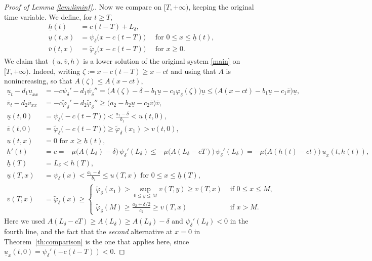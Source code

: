 \documentclass[reqno]{amsart}
\newcommand{\rev}[1]{#1}
\theoremstyle{plain}
\theoremstyle{definition}
\theoremstyle{remark}
\begin{document}
\begin{proof}[Proof of Lemma \ref{lem:liminf}.]
		\rev{Now we compare on $[T,+\infty)$, keeping the original time variable. We define, for $t\ge T$,}
		\begin{align*}
			\underline{h}(t)&=c \rev{(t-T)}+L_\delta ,\\
			\underline{u}(t,x)&=\psi_\delta\bigl(x-c \rev{(t-T)}\bigr) \quad\text{ for } 0\le x \le \underline{h}(t),\\
			\overline{v}(t,x)&=\tilde{\varphi}_\delta\bigl(x-c \rev{(t-T)}\bigr)\quad\text{ for } x \ge 0.
		\end{align*}
		We claim that \((\underline{u},\overline{v},\underline{h})\) is a lower solution of the original system \eqref{main} \rev{on $[T,+\infty)$}. Indeed, \rev{writing $\zeta:=x-c(t-T)\ge x-ct$ and using that $A$ is nonincreasing, so that $A(\zeta)\le A(x-ct)$,}
		\begin{align*}
			\underline{u}_t-d_1\underline{u}_{xx}
			&=-c\psi_\delta'-d_1\psi_\delta''
			\rev{{}=\bigl(A(\zeta)-\delta-b_1\underline{u}-c_1\varphi_\delta(\zeta)\bigr)\underline{u}}
			\le\bigl(A(x-ct)-b_1\underline{u}-c_1\overline{v}\bigr)\underline{u},\\
			\overline{v}_t-d_2\overline{v}_{xx}
			&=-c\tilde{\varphi}_\delta'-d_2\tilde{\varphi}_\delta''
			\ge\bigl(a_2-b_2\underline{u}-c_2\overline{v}\bigr)\overline{v},\\
			\underline{u}(t,0)&=\psi_\delta\bigl(\rev{-c(t-T)}\bigr) < \frac{a_1 - \delta}{b_1} < u(\rev{t},0),\\
			\overline{v}(t,0)&=\tilde{\varphi}_\delta\bigl(\rev{-c(t-T)}\bigr)\ge\tilde{\varphi}_\delta(x_1) > v(\rev{t},0),\\
			\underline{u}(t,x)&=0 \text{ for } x \ge \underline{h}(t),\\
			\underline{h}'(t)&=c=-\mu\bigl(A(L_\delta)-\delta\bigr)\,\psi_\delta'(L_\delta) \le -\mu\bigl(\rev{A(L_\delta-cT)}\bigr)\,\psi_\delta'(L_\delta) = -\mu\bigl(A(\underline{h}(t)-ct)\bigr)\,\underline{u}_x(t,\underline{h}(t)),\\
			\rev{\underline{h}(T)}&\rev{{}=L_\delta<h(T)},\\
			\rev{\underline{u}(T,x)}&\rev{{}=\psi_\delta(x) < \frac{a_1 - \delta}{b_1} \le u(T,x) \text{ for } 0\le x\le \underline{h}(T)},\\
			\rev{\overline{v}(T,x)}&\rev{{}=\tilde{\varphi}_\delta(x) \ge \begin{cases}
				\tilde{\varphi}_\delta(x_1)>\sup_{0\le y\le M}v(T,y)\ge v(T,x) & \text{ if } 0\le x\le M,\\
				\tilde{\varphi}_\delta(M)\ge\frac{a_2+\delta/2}{c_2}\ge v(T,x) & \text{ if } x> M.
			\end{cases}}
		\end{align*}
		\rev{Here we used $A(L_\delta-cT)\ge A(L_\delta)\ge A(L_\delta)-\delta$ and
		$\psi_\delta'(L_\delta)<0$ in the fourth line, and the fact that the
		\emph{second} alternative at $x=0$ in Theorem~\ref{th:comparison} is the one
		that applies here, since $\underline u_x(t,0)=\psi_\delta'(-c(t-T))<0$.}
		

\end{proof}
\end{document}
